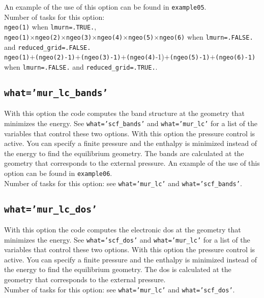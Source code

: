 \documentclass[12pt,a4paper]{article}
\begin{document}
An example of the use of this option can be found in \texttt{example05}.\\
Number of tasks for this option: \\
\texttt{ngeo(1)} when \texttt{lmurn=.TRUE.}, \\
\texttt{ngeo(1)}$\times$\texttt{ngeo(2)}$\times$\texttt{ngeo(3)}$\times$\texttt{ngeo(4)}$\times$\texttt{ngeo(5)}$\times$\texttt{ngeo(6)} when 
\texttt{lmurn=.FALSE.} and \texttt{reduced\_grid=.FALSE.}\\
\texttt{ngeo(1)}$+$\texttt{(ngeo(2)-1)}$+$\texttt{(ngeo(3)-1)}$+$\texttt{(ngeo(4)}-1)$+$\texttt{(ngeo(5)-1)}$+$\texttt{(ngeo(6)-1)} when 
\texttt{lmurn=.FALSE.} and \texttt{reduced\_grid=.TRUE.}.


\subsection{\color{web-blue}\texttt{what='mur\_lc\_bands'}}
With this option the code computes the band structure at the geometry 
that minimizes the energy. See  
\texttt{what='scf\_bands'} and \texttt{what='mur\_lc'} for a list of 
the variables that control these two options. 
With this option the pressure control is active. You can specify a
finite pressure and the enthalpy is minimized instead of the
energy to find the equilibrium geometry. The bands are calculated
at the geometry that corresponds to the external pressure.
An example of the use of this option can be found in \texttt{example06}. \\
Number of tasks for this option: see \texttt{what='mur\_lc'} and
\texttt{what='scf\_bands'}.

\subsection{\color{web-blue}\texttt{what='mur\_lc\_dos'}}
With this option the code computes the electronic dos at the geometry 
that minimizes the energy. See  
\texttt{what='scf\_dos'} and \texttt{what='mur\_lc'} for a list of 
the variables that control these two options. 
With this option the pressure control is active. You can specify a
finite pressure and the enthalpy is minimized instead of the
energy to find the equilibrium geometry. The dos is calculated
at the geometry that corresponds to the external pressure. \\
Number of tasks for this option: see \texttt{what='mur\_lc'} and 
\texttt{what='scf\_dos'}.
\end{document}
